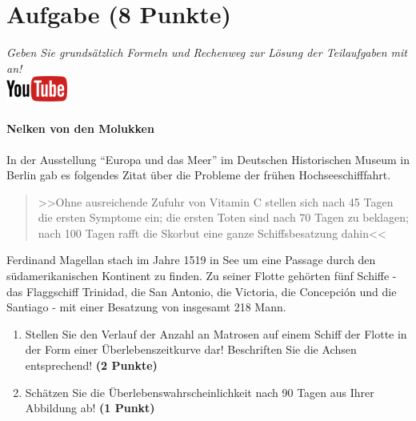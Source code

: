 \documentclass[a4paper, 9pt]{scrartcl}\usepackage[]{graphicx}\usepackage[]{xcolor}
\begin{document}
 
\clearpage

\section{Aufgabe \hfill (8 Punkte)}

\textit{Geben Sie grunds{\"a}tzlich Formeln und Rechenweg zur L{\"o}sung der
  Teilaufgaben mit an!} \\[1Ex]

\hfill\href{https://youtu.be/1B53cVFIU7Q}{\includegraphics[width =
  2cm]{img/youtube}} %
\hspace{2Ex}

\paragraph{Nelken von den Molukken}



In der Ausstellung "`Europa und das Meer"' im Deutschen Historischen Museum in
Berlin gab es folgendes Zitat {\"u}ber die Probleme der fr{\"u}hen Hochseeschifffahrt.

\begin{quote}
  >>Ohne ausreichende Zufuhr von Vitamin C stellen sich nach 45 Tagen die
  ersten Symptome ein; die ersten Toten sind nach 70 Tagen zu beklagen;
  nach 100 Tagen rafft die Skorbut eine ganze Schiffsbesatzung dahin<<
\end{quote}

Ferdinand Magellan stach im Jahre 1519 in See um eine Passage durch den
s{\"u}damerikanischen Kontinent zu finden. Zu seiner Flotte geh{\"o}rten
f{\"u}nf Schiffe - das Flaggschiff Trinidad, die San Antonio, die Victoria, die
Concepci{\'o}n und die Santiago - mit einer Besatzung von insgesamt
218 Mann. 

\begin{enumerate}
\item Stellen Sie den Verlauf der Anzahl an Matrosen auf einem Schiff der
  Flotte in der Form einer {\"U}berlebenszeitkurve dar! Beschriften Sie die
  Achsen entsprechend! \textbf{(2 Punkte)} 
\item Sch{\"a}tzen Sie die {\"U}berlebenswahrscheinlichkeit nach 90 Tagen
  aus Ihrer Abbildung ab! \textbf{(1 Punkt)} 
\end{enumerate}
\end{document}

